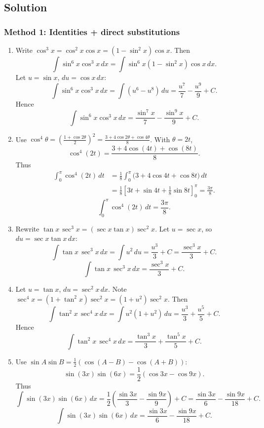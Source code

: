 \documentclass[12pt]{article}
\begin{document}
\subsection*{Solution}

\subsubsection*{Method 1: Identities + direct substitutions}

\begin{enumerate}[label=(\alph*)]
\item Write \(\cos^{3}x=\cos^{2}x\cos x=(1-\sin^{2}x)\cos x\). Then
\[
\int \sin^{6}x\cos^{3}x\,dx
=\int \sin^{6}x(1-\sin^{2}x)\cos x\,dx.
\]
Let \(u=\sin x\), \(du=\cos x\,dx\):
\[
\int \sin^{6}x\cos^{3}x\,dx
=\int (u^{6}-u^{8})\,du
=\frac{u^{7}}{7}-\frac{u^{9}}{9}+C.
\]
Hence
\[
\boxed{\int \sin^{6}x\cos^{3}x\,dx=\frac{\sin^{7}x}{7}-\frac{\sin^{9}x}{9}+C.}
\]

\item Use \(\cos^{4}\theta=\left(\frac{1+\cos 2\theta}{2}\right)^{2}=\frac{3+4\cos 2\theta+\cos 4\theta}{8}\).
With \(\theta=2t\),
\[
\cos^{4}(2t)=\frac{3+4\cos(4t)+\cos(8t)}{8}.
\]
Thus
\begin{align*}
\int_{0}^{\pi}\cos^{4}(2t)\,dt
&=\frac{1}{8}\int_{0}^{\pi}\big(3+4\cos 4t+\cos 8t\big)\,dt\\
&=\frac{1}{8}\left[3t+\sin 4t+\frac{1}{8}\sin 8t\right]_{0}^{\pi}
=\frac{3\pi}{8}.
\end{align*}
\[
\boxed{\int_{0}^{\pi}\cos^{4}(2t)\,dt=\frac{3\pi}{8}.}
\]

\item Rewrite \(\tan x\,\sec^{3}x=(\sec x\tan x)\sec^{2}x\). Let \(u=\sec x\), so \(du=\sec x\tan x\,dx\):
\[
\int \tan x\,\sec^{3}x\,dx=\int u^{2}\,du=\frac{u^{3}}{3}+C=\frac{\sec^{3}x}{3}+C.
\]
\[
\boxed{\int \tan x\,\sec^{3}x\,dx=\frac{\sec^{3}x}{3}+C.}
\]

\item Let \(u=\tan x\), \(du=\sec^{2}x\,dx\). Note \(\sec^{4}x=(1+\tan^{2}x)\sec^{2}x=(1+u^{2})\sec^{2}x\). Then
\[
\int \tan^{2}x\,\sec^{4}x\,dx
=\int u^{2}(1+u^{2})\,du
=\frac{u^{3}}{3}+\frac{u^{5}}{5}+C.
\]
Hence
\[
\boxed{\int \tan^{2}x\,\sec^{4}x\,dx=\frac{\tan^{3}x}{3}+\frac{\tan^{5}x}{5}+C.}
\]

\item Use \(\sin A\sin B=\frac{1}{2}(\cos(A-B)-\cos(A+B))\):
\[
\sin(3x)\sin(6x)=\frac{1}{2}(\cos 3x-\cos 9x).
\]
Thus
\[
\int \sin(3x)\sin(6x)\,dx
=\frac{1}{2}\left(\frac{\sin 3x}{3}-\frac{\sin 9x}{9}\right)+C
=\frac{\sin 3x}{6}-\frac{\sin 9x}{18}+C.
\]
\[
\boxed{\int \sin(3x)\sin(6x)\,dx=\frac{\sin 3x}{6}-\frac{\sin 9x}{18}+C.}
\]


\end{enumerate}
\end{document}
